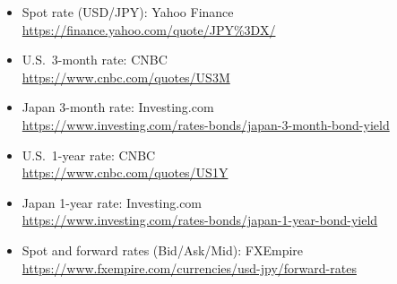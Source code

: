 \documentclass[11pt]{article}
\begin{document}
\begin{itemize}
\item Spot rate (USD/JPY): Yahoo Finance \\
\url{https://finance.yahoo.com/quote/JPY%3DX/}

\item U.S.\ 3-month rate: CNBC \\
\url{https://www.cnbc.com/quotes/US3M}

\item Japan 3-month rate: Investing.com \\
\url{https://www.investing.com/rates-bonds/japan-3-month-bond-yield}

\item U.S.\ 1-year rate: CNBC \\
\url{https://www.cnbc.com/quotes/US1Y}

\item Japan 1-year rate: Investing.com \\
\url{https://www.investing.com/rates-bonds/japan-1-year-bond-yield}

\item Spot and forward rates (Bid/Ask/Mid): FXEmpire \\
\url{https://www.fxempire.com/currencies/usd-jpy/forward-rates}
\end{itemize}
\end{document}
